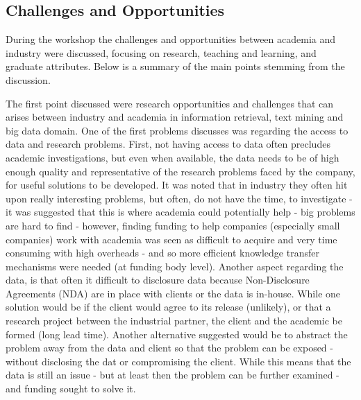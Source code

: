 
\subsection{Challenges and Opportunities}
During the workshop the challenges and opportunities between academia and industry were discussed, focusing on research, teaching and learning, and graduate attributes. Below is a summary of the main points stemming from the discussion.

The first point discussed were research opportunities and challenges that can arises between industry and academia in information retrieval, text mining and big data domain. One of the first problems discusses was regarding the access to data and research problems. First, not having access to data often precludes academic investigations,  but even when available, the data needs to be of high enough quality and representative of the research problems faced by the company, for useful solutions to be developed. It was noted that in industry they often hit upon really interesting problems, but often, do not have the time, to investigate - it was suggested that this is where academia could potentially help - big problems are hard to find - however, finding funding to help companies (especially small companies) work with academia was seen as difficult to acquire and very time consuming with high overheads - and so more efficient knowledge transfer mechanisms were needed (at funding body level). Another aspect regarding the data, is that often it difficult to disclosure data because Non-Disclosure Agreements (NDA) are in place with clients or the data is in-house. While one solution would be if the client would agree to its release (unlikely), or that a research project between the industrial partner, the client and the academic be formed (long lead time). Another alternative suggested would be to abstract the problem away from the data and client so that the problem can be exposed - without disclosing the dat or compromising the client. While this means that the data is still an issue - but at least then the problem can be further examined - and funding sought to solve it.




